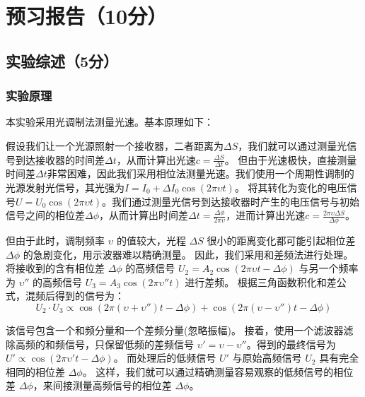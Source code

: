 \documentclass[]{../template/Report}%
\begin{document}
\maketitle

\section{预习报告（10分）}
\subsection{实验综述（5分）}
\subsubsection{实验原理}
本实验采用光调制法测量光速。基本原理如下：

假设我们让一个光源照射一个接收器，二者距离为$\Delta S$，我们就可以通过测量光信号到达接收器的时间差$\Delta t$，从而计算出光速$c=\frac{\Delta S}{\Delta t}$。
但由于光速极快，直接测量时间差$\Delta t$非常困难，因此我们采用相位法测量光速。我们使用一个周期性调制的光源发射光信号，其光强为$I=I_0 +\Delta I_0 \cos(2\pi \upsilon t)$。
将其转化为变化的电压信号$U=U_0 \cos(2\pi \upsilon t)$。我们通过测量光信号到达接收器时产生的电压信号与初始信号之间的相位差$\Delta \phi$，从而计算出时间差$\Delta t=\frac{\Delta \phi}{2\pi \upsilon }$，进而计算出光速$c=\frac{2\pi \upsilon  \Delta S}{\Delta \phi}$。

但由于此时，调制频率 $\upsilon $ 的值较大，光程 $\Delta S$ 很小的距离变化都可能引起相位差 $\Delta \phi$ 的急剧变化，用示波器难以精确测量。
因此，我们采用和差频法进行处理。将接收到的含有相位差 $\Delta \phi$ 的高频信号 $U_2 = A_2 \cos(2\pi \upsilon t - \Delta\phi)$ 与另一个频率为 $\upsilon ''$ 的高频信号 $U_3 = A_3 \cos(2\pi \upsilon ''t)$ 进行差频。
根据三角函数积化和差公式，混频后得到的信号为：
\begin{equation}
U_2 \cdot U_3 \propto \cos(2\pi(\upsilon +\upsilon '')t - \Delta\phi) + \cos(2\pi(\upsilon -\upsilon '')t - \Delta\phi)
\end{equation}

该信号包含一个和频分量和一个差频分量(忽略振幅)。
接着，使用一个滤波器滤除高频的和频信号，只保留低频的差频信号 $\upsilon ' = \upsilon  - \upsilon ''$。得到的最终信号为 $U' \propto \cos(2\pi \upsilon 't - \Delta\phi)$。
而处理后的低频信号 $U'$ 与原始高频信号 $U_2$ 具有完全相同的相位差 $\Delta\phi$。
这样，我们就可以通过精确测量容易观察的低频信号的相位差 $\Delta\phi$，来间接测量高频信号的相位差 $\Delta\phi$。
\end{document}

